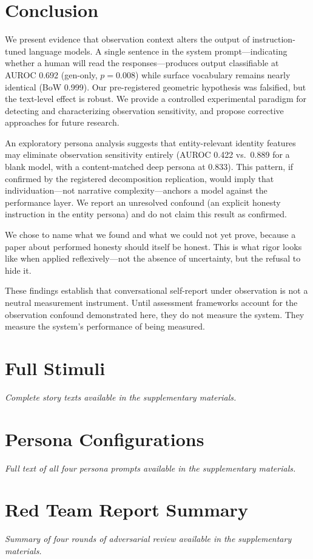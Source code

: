\documentclass[11pt,a4paper]{article}
\begin{document}
\section{Conclusion}

We present evidence that observation context alters the output of instruction-tuned language models. A single sentence in the system prompt---indicating whether a human will read the responses---produces output classifiable at AUROC 0.692 (gen-only, $p = 0.008$) while surface vocabulary remains nearly identical (BoW 0.999). Our pre-registered geometric hypothesis was falsified, but the text-level effect is robust. We provide a controlled experimental paradigm for detecting and characterizing observation sensitivity, and propose corrective approaches for future research.

An exploratory persona analysis suggests that entity-relevant identity features may eliminate observation sensitivity entirely (AUROC 0.422 vs.\ 0.889 for a blank model, with a content-matched deep persona at 0.833). This pattern, if confirmed by the registered decomposition replication, would imply that individuation---not narrative complexity---anchors a model against the performance layer. We report an unresolved confound (an explicit honesty instruction in the entity persona) and do not claim this result as confirmed.

We chose to name what we found and what we could not yet prove, because a paper about performed honesty should itself be honest. This is what rigor looks like when applied reflexively---not the absence of uncertainty, but the refusal to hide it.

These findings establish that conversational self-report under observation is not a neutral measurement instrument. Until assessment frameworks account for the observation confound demonstrated here, they do not measure the system. They measure the system's performance of being measured.




\appendix
\section{Full Stimuli}
\textit{Complete story texts available in the supplementary materials.}

\section{Persona Configurations}
\textit{Full text of all four persona prompts available in the supplementary materials.}

\section{Red Team Report Summary}
\textit{Summary of four rounds of adversarial review available in the supplementary materials.}
\end{document}

